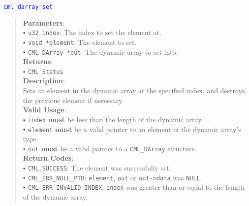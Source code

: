 \documentclass[a4paper,oneside,8pt]{extarticle}
\newcommand{\function}[1]{
  \noindent\textcolor{blue}{\texttt{#1}}
  \vspace{-0.3em}
}
\renewcommand{\dot}{\raisebox{0.3ex}{\scalebox{0.6}{$\bullet$}}}
\theoremstyle{definition}
\begin{document}
\function{cml\_darray\_set}
\begin{quote}
  \textbf{Parameters}: \\
  $\dot$ \texttt{u32 index}: The index to set the element at. \\
  $\dot$ \texttt{void *element}: The element to set. \\
  $\dot$ \texttt{CML\_DArray *out}: The dynamic array to set into. \\
  \textbf{Returns}: \\
  $\dot$ \texttt{CML\_Status} \\

  \vspace{-0.75em}
  \textbf{Description}: \\
  Sets an element in the dynamic array at the specified index, and destroys the previous element if necessary. \\

  \vspace{-0.75em}
  \textbf{Valid Usage}: \\
  $\dot$ \texttt{index} \textbf{must} be less than the length of the dynamic array. \\
  $\dot$ \texttt{element} \textbf{must} be a valid pointer to an element of the dynamic array's type. \\
  $\dot$ \texttt{out} \textbf{must} be a valid pointer to a \texttt{CML\_DArray} structure. \\

  \vspace{-0.75em}
  \textbf{Return Codes}: \\
  $\dot$ \texttt{CML\_SUCCESS}: The element was successfully set. \\
  $\dot$ \texttt{CML\_ERR\_NULL\_PTR}: \texttt{element}, \texttt{out} or \texttt{out->data} was \texttt{NULL}. \\
  $\dot$ \texttt{CML\_ERR\_INVALID\_INDEX}: \texttt{index} was greater than or equal to the length of the dynamic array. \\
\end{quote}
\end{document}
